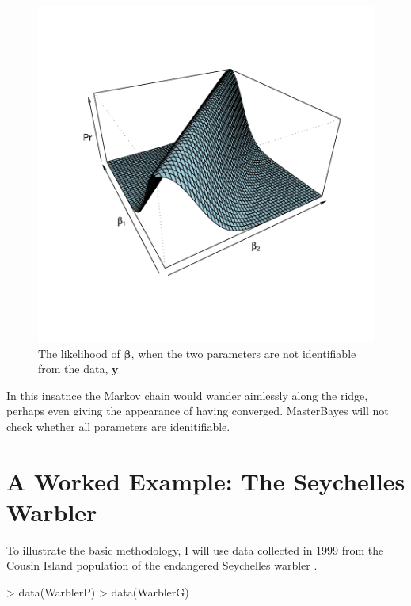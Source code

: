 \documentclass{article}
\begin{document}
\begin{figure}[!h]
\begin{center}
\includegraphics{Tutorial-009}
\end{center}
\caption{The likelihood of $\bm{\beta}$, when the two parameters are not identifiable from the data, $\bm{y}$}
\label{likP}
\end{figure}

In this insatnce the Markov chain would wander aimlessly along the ridge, perhaps even giving the appearance of having converged.  MasterBayes will not check whether all parameters are idenitifiable.

\section{\large{A Worked Example: The Seychelles Warbler}}
\label{Warbler-sec}

To illustrate the basic methodology, I will use data collected in 1999 from the Cousin Island population of the endangered Seychelles warbler \citep{Richardson.2001}. 

\begin{Schunk}
\begin{Sinput}
> data(WarblerP)
> data(WarblerG)
\end{Sinput}
\end{Schunk}
\end{document}
